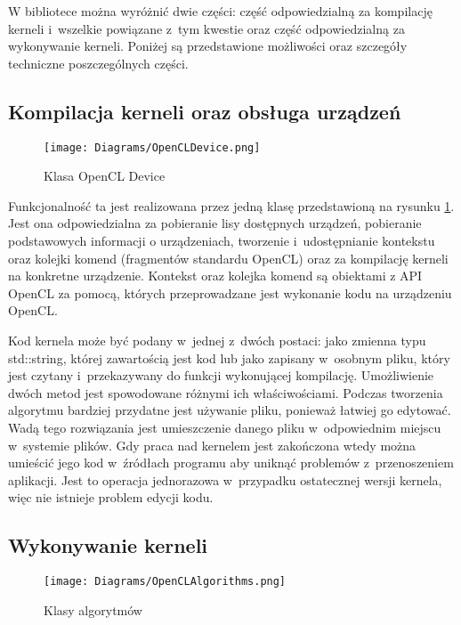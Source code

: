 W bibliotece można wyróżnić dwie części: część odpowiedzialną za kompilację kerneli i~wszelkie powiązane z~tym kwestie oraz część odpowiedzialną za wykonywanie kerneli.
Poniżej są przedstawione możliwości oraz szczegóły techniczne poszczególnych części.

\subsection{Kompilacja kerneli oraz obsługa urządzeń}
\label{subsec:kompilacjakerneli}

\begin{figure}
\begin{center}
\texttt{[image: Diagrams/OpenCLDevice.png]}
\end{center}
\caption{Klasa OpenCL Device}
\label{fig:opencldevice}
\end{figure}

Funkcjonalność ta jest realizowana przez jedną klasę przedstawioną na rysunku \ref{fig:opencldevice}. Jest ona odpowiedzialna za pobieranie lisy dostępnych urządzeń, pobieranie podstawowych informacji o urządzeniach, tworzenie i~udostępnianie kontekstu oraz kolejki komend (fragmentów standardu OpenCL) oraz za kompilację kerneli na konkretne urządzenie. Kontekst oraz kolejka komend są obiektami z API OpenCL za pomocą, których przeprowadzane jest wykonanie kodu na urządzeniu OpenCL.

Kod kernela może być podany w~jednej z~dwóch postaci: jako zmienna typu std::string, której zawartością jest kod lub jako zapisany w~osobnym pliku, który jest czytany i~przekazywany do funkcji wykonującej kompilację. Umożliwienie dwóch metod jest spowodowane różnymi ich właściwościami. Podczas tworzenia algorytmu bardziej przydatne jest używanie pliku, ponieważ łatwiej go edytować.  Wadą tego rozwiązania jest umieszczenie danego pliku w~odpowiednim miejscu w~systemie plików. Gdy praca nad kernelem jest zakończona wtedy można umieścić jego kod w~źródłach programu aby uniknąć problemów z~przenoszeniem aplikacji. Jest to operacja jednorazowa w~przypadku ostatecznej wersji kernela, więc nie istnieje problem edycji kodu.

\subsection{Wykonywanie kerneli}
\label{subsec:wykonywaniekerneli}

\begin{figure}
\begin{center}
\texttt{[image: Diagrams/OpenCLAlgorithms.png]}
\end{center}
\caption{Klasy algorytmów}
\label{fig:openclalgorithms}
\end{figure}

